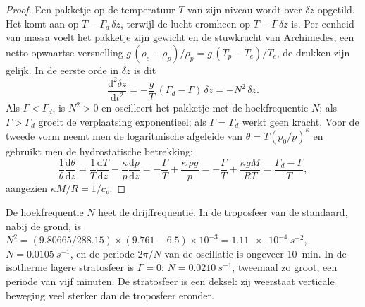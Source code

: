 \begin{proof}
Een pakketje op de temperatuur $T$ van zijn niveau wordt over $\delta z$ opgetild. Het komt aan op $T - \Gamma_d\,\delta z$, terwijl de lucht eromheen op $T - \Gamma\,\delta z$ is. Per eenheid van massa voelt het pakketje zijn gewicht en de stuwkracht van Archimedes, een netto opwaartse versnelling $g\,(\rho_e - \rho_p)/\rho_p = g\,(T_p - T_e)/T_e$, de drukken zijn gelijk. In de eerste orde in $\delta z$ is dit
\[
  \frac{\mathrm d^2 \delta z}{\mathrm dt^2} = -\frac{g}{T}\,(\Gamma_d - \Gamma)\,\delta z = -N^2\,\delta z .
\]
Als $\Gamma < \Gamma_d$, is $N^2 > 0$ en oscilleert het pakketje met de hoekfrequentie $N$; als $\Gamma > \Gamma_d$ groeit de verplaatsing exponentieel; als $\Gamma = \Gamma_d$ werkt geen kracht. Voor de tweede vorm neemt men de logaritmische afgeleide van $\theta = T (p_0/p)^{\kappa}$ en gebruikt men de hydrostatische betrekking:
\[
  \frac{1}{\theta}\frac{\mathrm d\theta}{\mathrm dz} = \frac{1}{T}\frac{\mathrm dT}{\mathrm dz}
  - \frac{\kappa}{p}\frac{\mathrm dp}{\mathrm dz} = -\frac{\Gamma}{T} + \frac{\kappa\,\rho g}{p}
  = -\frac{\Gamma}{T} + \frac{\kappa g M}{RT} = \frac{\Gamma_d - \Gamma}{T},
\]
aangezien $\kappa M/R = 1/c_p$.
\end{proof}

De hoekfrequentie $N$ heet de drijffrequentie. In de troposfeer van de standaard, nabij de grond, is $N^2 = (9.80665/288.15) \times (9.761 -
6.5)\times10^{-3} = \qty{1.11e-4}{s^{-2}}$, $N = \qty{0.0105}{s^{-1}}$, en de
periode $2\pi/N$ van de oscillatie is ongeveer \qty{10}{min}. In de isotherme
lagere stratosfeer is $\Gamma = 0$: $N = \qty{0.0210}{s^{-1}}$, tweemaal zo groot, een
periode van vijf minuten. De stratosfeer is een deksel: zij weerstaat verticale beweging veel sterker dan de troposfeer eronder.

